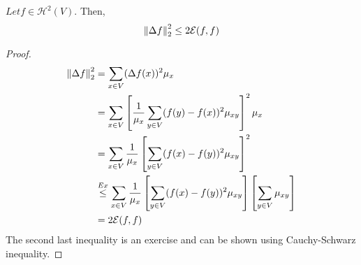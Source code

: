 \documentclass[main]{subfiles}
\begin{document}
\begin{prop}
    $Let f \in \mathcal{H}^2(V)$. Then,
    \[\left\lVert\Delta f\right\rVert_{2}^2 \leq 2 \mathcal{E}(f,f)\]
    \begin{proof}
        \begin{align*}
            \left\lVert\Delta f\right\rVert_{2}^2 & = \sum_{x \in V} (\Delta f(x))^2\mu_x                                                                                                  \\
                                 & =\sum_{x \in V} \left[\frac{1}{\mu_x} \sum_{y \in V}(f(y)-f(x))^2\mu_{xy}\right]^2\mu_x                                                \\
                                 & = \sum_{x \in V} \frac{1}{\mu_x} \left[\sum_{y \in V}(f(x)-f(y))^2\mu_{xy}\right]^2                                                    \\
                                 & \stackrel{Ex}{\leq} \sum_{x \in V}\frac{1}{\mu_x} \left[\sum_{y \in V}(f(x)-f(y))^2\mu_{xy}\right]\left[\sum_{y \in V} \mu_{xy}\right] \\
                                 & = 2 \mathcal{E}(f,f)
        \end{align*}
        The second last inequality is an exercise and can be shown using Cauchy-Schwarz inequality.
    \end{proof}
\end{prop}
\end{document}
